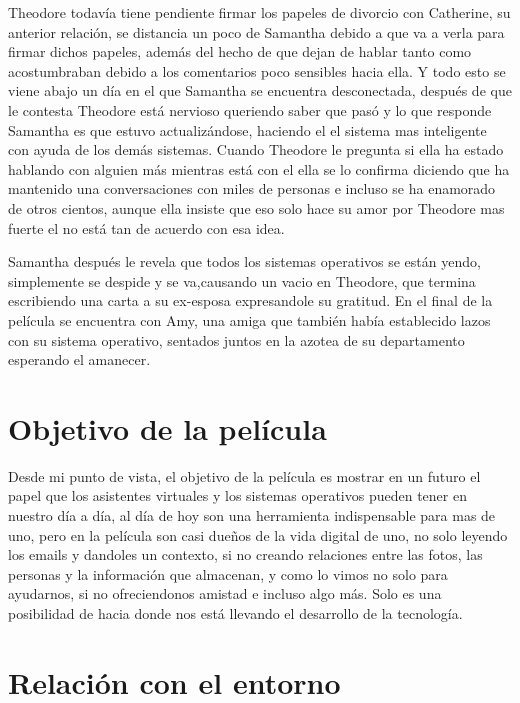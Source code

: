 \documentclass[paper=a4, fontsize=12pt]{scrartcl} %
\begin{document}
Theodore todavía tiene pendiente firmar los papeles de divorcio con Catherine, su anterior relación, se distancia un poco de Samantha debido a que va a verla para firmar dichos papeles, además del hecho de que dejan de hablar tanto como acostumbraban debido a los comentarios poco sensibles hacia ella. Y todo esto se viene abajo un día en el que Samantha se encuentra desconectada, después de que le contesta Theodore está nervioso queriendo saber que pasó y lo que responde Samantha es que estuvo actualizándose, haciendo el el sistema mas inteligente con ayuda de los demás sistemas. Cuando Theodore le pregunta si ella ha estado hablando con alguien más mientras está con el ella se lo confirma diciendo que ha mantenido una conversaciones con miles de personas e incluso se ha enamorado de otros cientos, aunque ella insiste que eso solo hace su amor por Theodore mas fuerte el no está tan de acuerdo con esa idea.\vspace{4mm}

Samantha después le revela que todos los sistemas operativos se están yendo, simplemente se despide y se va,causando un vacio en Theodore, que termina escribiendo una carta a su ex-esposa expresandole su gratitud. En el final de la película se encuentra con Amy, una amiga que también había establecido lazos con su sistema operativo, sentados juntos en la azotea de su departamento esperando el amanecer.


\section{Objetivo de la película}

Desde mi punto de vista, el objetivo de la película es mostrar en un futuro el papel que los asistentes virtuales y los sistemas operativos pueden tener en nuestro día a día, al día de hoy son una herramienta indispensable para mas de uno, pero en la película son casi dueños de la vida digital de uno, no solo leyendo los emails y dandoles un contexto, si no creando relaciones entre las fotos, las personas y la información que almacenan, y como lo vimos no solo para ayudarnos, si no ofreciendonos amistad e incluso algo más. Solo es una posibilidad de hacia donde nos está llevando el desarrollo de la tecnología.


\section{Relación con el entorno}
\end{document}
